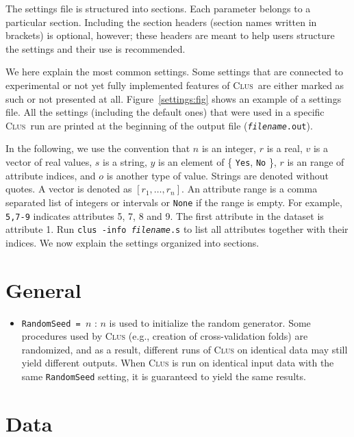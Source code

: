 \documentclass[a4paper]{report}
\newcommand{\clus}{\textsc{Clus}}
\begin{document}
The settings file is structured into sections.  Each parameter belongs to a particular section.  Including the section headers (section names written in brackets) is optional, however; these headers are meant to help users structure the settings and their use is recommended.

We here explain the most common settings. Some settings that are connected to experimental or not yet fully implemented features of \clus\ are either marked as such or not presented at all.  Figure~\ref{settings:fig} shows  an example of a settings file. All the settings (including the default ones) that were used in a specific \clus\ run are printed at the beginning of the output file (\texttt{\emph{filename}.out}).

In the following, we use the convention that $n$ is an integer, $r$ is a real, $v$ is a vector of real values, $s$ is a string, $y$ is an element of \{ {\tt Yes}, {\tt No} \}, $r$ is an range of attribute indices, and $o$ is another type of value.  Strings are denoted without quotes. A vector is denoted as $[r_1,\ldots,r_n]$. An attribute range is a comma separated list of integers or intervals or \texttt{None} if the range is empty. For example, {\tt 5,7-9} indicates attributes 5, 7, 8 and 9. The first attribute in the dataset is attribute 1. Run {\tt clus -info {\em filename}.s} to list all attributes together with their indices. We now explain the settings organized into sections.

\section{General}

\begin{itemize}
\item {\tt RandomSeed = $n$}\label{sett:seed} : $n$ is used to initialize the random generator.
Some procedures used by \clus{} (e.g., creation of cross-validation folds) are randomized, and as a result, different runs of \clus{} on identical data may still yield different outputs.  When \clus{} is run on identical input data with the same {\tt RandomSeed} setting, it is guaranteed to yield the same results.
\end{itemize}

\section{Data}
\end{document}
